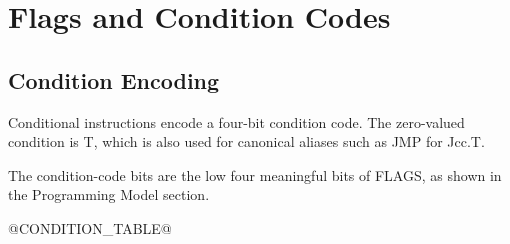 \clearpage
\section{Flags and Condition Codes}\label{page:flags-and-condition-codes}

\subsection{Condition Encoding}

Conditional instructions encode a four-bit condition code. The zero-valued condition is T, which is also used for
canonical aliases such as JMP for Jcc.T.

The condition-code bits are the low four meaningful bits of FLAGS, as shown in the Programming Model section.

@CONDITION_TABLE@
